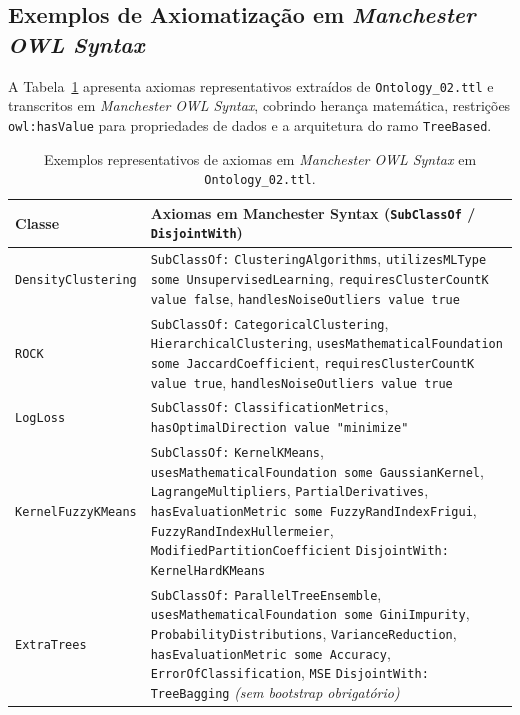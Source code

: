 \documentclass[11pt,a4paper]{article}
\newcommand{\onto}[1]{\texttt{#1}}
\begin{document}
\subsection{Exemplos de Axiomatização em \emph{Manchester OWL Syntax}}

A Tabela~\ref{tab:manchester} apresenta axiomas representativos extraídos de \texttt{Ontology\_02.ttl} e transcritos em \emph{Manchester OWL Syntax}, cobrindo herança matemática, restrições \onto{owl:hasValue} para propriedades de dados e a arquitetura do ramo \onto{TreeBased}.

\begin{table}[htbp]
\centering
\caption{Exemplos representativos de axiomas em \emph{Manchester OWL Syntax} em \texttt{Ontology\_02.ttl}.}
\label{tab:manchester}
\footnotesize
\begin{tabularx}{\textwidth}{@{}p{3.6cm}>{\raggedright\arraybackslash}X@{}}
\toprule
\textbf{Classe} & \textbf{Axiomas em Manchester Syntax (\texttt{SubClassOf} / \texttt{DisjointWith})} \\
\midrule
\onto{DensityClustering} & \onto{SubClassOf:} \onto{ClusteringAlgorithms}, \onto{utilizesMLType some UnsupervisedLearning}, \onto{requiresClusterCountK value false}, \onto{handlesNoiseOutliers value true} \\
\addlinespace[3pt]
\onto{ROCK} & \onto{SubClassOf:} \onto{CategoricalClustering}, \onto{HierarchicalClustering}, \onto{usesMathematicalFoundation some JaccardCoefficient}, \onto{requiresClusterCountK value true}, \onto{handlesNoiseOutliers value true} \\
\addlinespace[3pt]
\onto{LogLoss} & \onto{SubClassOf:} \onto{ClassificationMetrics}, \onto{hasOptimalDirection value "minimize"} \\
\addlinespace[3pt]
\onto{KernelFuzzyKMeans} & \onto{SubClassOf:} \onto{KernelKMeans}, \onto{usesMathematicalFoundation some GaussianKernel}, \onto{LagrangeMultipliers}, \onto{PartialDerivatives}, \onto{hasEvaluationMetric some FuzzyRandIndexFrigui}, \onto{FuzzyRandIndexHullermeier}, \onto{ModifiedPartitionCoefficient} \newline \onto{DisjointWith:} \onto{KernelHardKMeans} \\
\addlinespace[3pt]
\onto{ExtraTrees} & \onto{SubClassOf:} \onto{ParallelTreeEnsemble}, \onto{usesMathematicalFoundation some GiniImpurity}, \onto{ProbabilityDistributions}, \onto{VarianceReduction}, \onto{hasEvaluationMetric some Accuracy}, \onto{ErrorOfClassification}, \onto{MSE} \newline \onto{DisjointWith:} \onto{TreeBagging} \emph{(sem bootstrap obrigatório)} \\

\end{tabularx}
\end{table}
\end{document}
